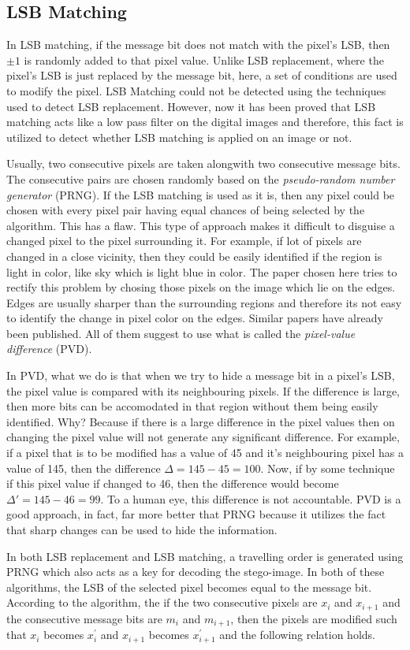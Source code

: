 \documentclass{report}
\begin{document}
\subsection{LSB Matching}
In LSB matching, if the message bit does not match with the pixel's LSB, then $\pm 1$ is randomly added to that pixel value. Unlike LSB replacement, where the pixel's LSB is just replaced by the message bit, here, a set of conditions are used to modify the pixel. LSB Matching could not be detected using the techniques used to detect LSB replacement. However, now it has been proved that LSB matching acts like a low pass filter on the digital images and therefore, this fact is utilized to detect whether LSB matching is applied on an image or not. \par Usually, two consecutive pixels are taken alongwith two consecutive message bits. The consecutive pairs are chosen randomly based on the {\it pseudo-random number generator} (PRNG). If the LSB matching is used as it is, then any pixel could be chosen with every pixel pair having equal chances of being selected by the algorithm. This has a flaw. This type of approach makes it difficult to disguise a changed pixel to the pixel surrounding it. For example, if lot of pixels are changed in a close vicinity, then they could be easily identified if the region is light in color, like sky which is light blue in color. The paper chosen here tries to rectify this problem by chosing those pixels on the image which lie on the edges. Edges are usually sharper than the surrounding regions and therefore its not easy to identify the change in pixel color on the edges. Similar papers have already been published. All of them suggest to use what is called the {\it pixel-value difference} (PVD). \par In PVD, what we do is that when we try to hide a message bit in a pixel's LSB, the pixel value is compared with its neighbouring pixels. If the difference is large, then more bits can be accomodated in that region without them being easily identified. Why? Because if there is a large difference in the pixel values then on changing the pixel value will not generate any significant difference. For example, if a pixel that is to be modified has a value of 45 and it's neighbouring pixel has a value of 145, then the difference $\displaystyle \Delta = 145-45=100$. Now, if by some technique if this pixel value if changed to 46, then the difference would become $\displaystyle \Delta' = 145-46 = 99$. To a human eye, this difference is not accountable. PVD is a good approach, in fact, far more better that PRNG because it utilizes the fact that sharp changes can be used to hide the information. \par In both LSB replacement and LSB matching, a travelling order is generated using PRNG which also acts as a key for decoding the stego-image. In both of these algorithms, the LSB of the selected pixel becomes equal to the message bit. According to the algorithm, the if the two consecutive pixels are $x_{i}$ and $x_{i+1}$ and the consecutive message bits are $m_{i}$ and $m_{i+1}$, then the pixels are modified such that $x_{i}$ becomes $x_{i}^{'}$ and $x_{i+1}$ becomes $x_{i+1}^{'}$ and the following relation holds.
\end{document}

